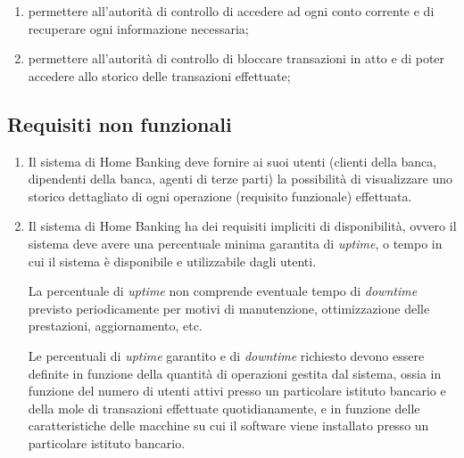\begin{enumerate}
	\item permettere all'autorità di controllo di accedere ad ogni conto corrente e di recuperare ogni informazione necessaria;
	\item permettere all'autorità di controllo di bloccare transazioni in atto e di poter accedere allo storico delle transazioni effettuate;

\end{enumerate}

\subsection{Requisiti non funzionali}

\begin{enumerate}
	\item Il sistema di Home Banking deve fornire ai suoi utenti (clienti della banca, dipendenti della banca, agenti di terze parti) la possibilit\`a di visualizzare uno storico dettagliato di ogni operazione (requisito funzionale) effettuata.

	\item Il sistema di Home Banking ha dei requisiti impliciti di disponibilit\`a, ovvero il sistema deve avere una percentuale minima garantita di \emph{uptime}, o tempo in cui il sistema \`e disponibile e utilizzabile dagli utenti.

	La percentuale di \emph{uptime} non comprende eventuale tempo di \emph{downtime} previsto periodicamente per motivi di manutenzione, ottimizzazione delle prestazioni, aggiornamento, etc.

	Le percentuali di \emph{uptime} garantito e di \emph{downtime} richiesto devono essere definite in funzione della quantit\`a di operazioni gestita dal sistema, ossia in funzione del numero di utenti attivi presso un particolare istituto bancario e della mole di transazioni effettuate quotidianamente, e in funzione delle caratteristiche delle macchine su cui il software viene installato presso un particolare istituto bancario.


\end{enumerate}
